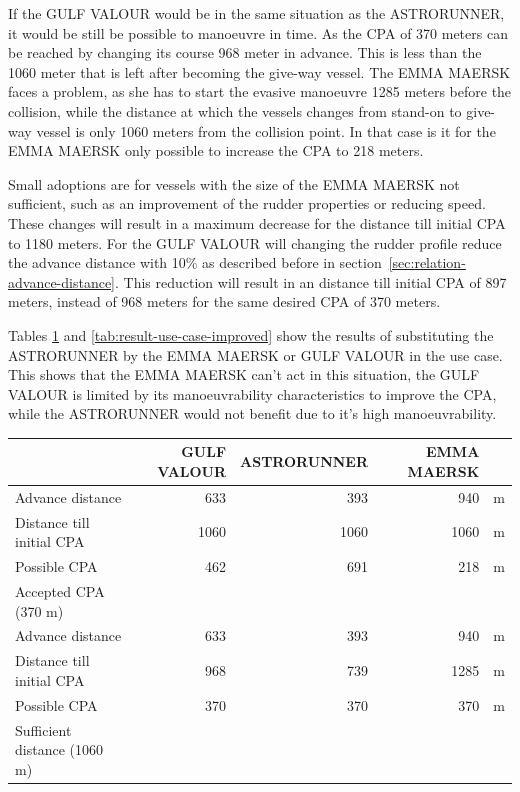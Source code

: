 If the GULF VALOUR would be in the same situation as the ASTRORUNNER, it would be still be possible to manoeuvre in time. As the CPA of 370 meters can be reached by changing its course 968 meter in advance. This is less than the 1060 meter that is left after becoming the give-way vessel. 
The EMMA MAERSK faces a problem, as she has to start the evasive manoeuvre 1285 meters before the collision, while the distance at which the vessels changes from stand-on to give-way vessel is only 1060 meters from the collision point. In that case is it for the EMMA MAERSK only possible to increase the CPA to 218 meters.

Small adoptions are for vessels with the size of the EMMA MAERSK not sufficient, such as an improvement of the rudder properties or reducing speed. These changes will result in a maximum decrease for the distance till initial CPA to 1180 meters. For the GULF VALOUR will changing the rudder profile reduce the advance distance with 10\% as described before in section~\ref{sec:relation-advance-distance}. This reduction will result in an distance till initial CPA of 897 meters, instead of 968 meters for the same desired CPA of 370 meters.

Tables \ref{tab:result-use-case-original} and \ref{tab:result-use-case-improved} show the results of substituting the ASTRORUNNER by the EMMA MAERSK or GULF VALOUR in the use case. This shows that the EMMA MAERSK can't act in this situation, the GULF VALOUR is limited by its manoeuvrability characteristics to improve the CPA, while the ASTRORUNNER would not benefit due to it's high manoeuvrability.

\begin{table}[p]
	\centering
	\begin{tabular}{l | r r r l}
		\toprule
		& GULF VALOUR & ASTRORUNNER & EMMA MAERSK & \\
		\midrule
		Advance distance & 633 & 393 & 940 & m \\
		Distance till initial CPA & 1060 & 1060 & 1060 & m \\
		Possible CPA & 462 & 691 & 218 & m \\
		Accepted CPA (370 m) & \cmark & \cmark & \xmark & \\
		\midrule
		Advance distance & 633 & 393 & 940 & m \\
		Distance till initial CPA & 968 & 739 & 1285 & m\\
		Possible CPA & 370 & 370 & 370 & m \\
		Sufficient distance (1060 m) & \cmark & \cmark & \xmark & \\
		\bottomrule
	\end{tabular}
\label{tab:result-use-case-original}
\end{table}


